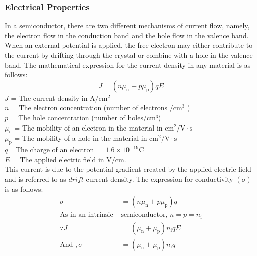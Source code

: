 \subsubsection{Electrical Properties}
In a semiconductor, there are two different mechanisms of current flow, namely, the electron flow in the conduction band and the hole flow in the valence band. When an external potential is applied, the free electron may either contribute to the current by drifting through the crystal or combine with a hole in the valence band. The mathematical expression for the current density in any material is as follows:
\begin{equation}
J=\left(n \mu_{\mathrm{n}}+p \mu_{\mathrm{p}}\right) q E
\end{equation}
 $J$ = The current density in $\mathrm{A} / \mathrm{cm}^{2} $\\
 $n$ = The electron concentration (number of electrons $/ \mathrm{cm}^{3}$ )\\ $p$ = The hole concentration (number of holes/cm³)\\ $\mu_{\mathrm{n}}$ = The mobility of an electron in the material in $\mathrm{cm}^{2} / \mathrm{V} \cdot \mathrm{s}$\\ $ \mu_{\mathrm{p}}$ =  The mobility of a hole in the material in $\mathrm{cm}^{2} / \mathrm{V} \cdot \mathrm{s}$\\ $q$= The charge of an electron $=1.6 \times 10^{-19} \mathrm{C}$ \\$E$ = The applied electric field in $\mathrm{V} / \mathrm{cm}$.\\
This current is due to the potential gradient created by the applied electric field and is referred to as $d r i f t$ current density. The expression for conductivity $(\sigma)$ is as follows:
\begin{align}
\sigma&=\left(n \mu_{\mathrm{n}}+p \mu_{\mathrm{p}}\right) q\\
\text{As in an intrinsic }&\text{semiconductor, $n=p=n_{\mathrm{i}}$} \\
\because J&=\left(\mu_{\mathrm{n}}+\mu_{\mathrm{p}}\right) n_{\mathrm{i}} q E  \\
\text{And }, \sigma&=\left(\mu_{\mathrm{n}}+\mu_{\mathrm{p}}\right) n_{\mathrm{i}} q
\end{align}
